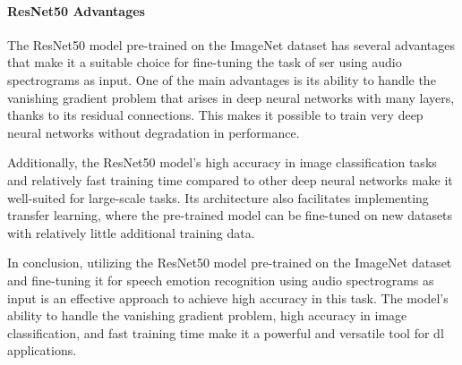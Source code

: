 \paragraph{ResNet50 Advantages}

The ResNet50 model pre-trained on the ImageNet dataset has several advantages that make it a suitable choice for fine-tuning the task of \ac{ser} using audio spectrograms as input. One of the main advantages is its ability to handle the vanishing gradient problem that arises in deep neural networks with many layers, thanks to its residual connections. This makes it possible to train very deep neural networks without degradation in performance.

Additionally, the ResNet50 model's high accuracy in image classification tasks and relatively fast training time compared to other deep neural networks make it well-suited for large-scale tasks. Its architecture also facilitates implementing transfer learning, where the pre-trained model can be fine-tuned on new datasets with relatively little additional training data.

In conclusion, utilizing the ResNet50 model pre-trained on the ImageNet dataset and fine-tuning it for speech emotion recognition using audio spectrograms as input is an effective approach to achieve high accuracy in this task. The model's ability to handle the vanishing gradient problem, high accuracy in image classification, and fast training time make it a powerful and versatile tool for \ac{dl} applications.
